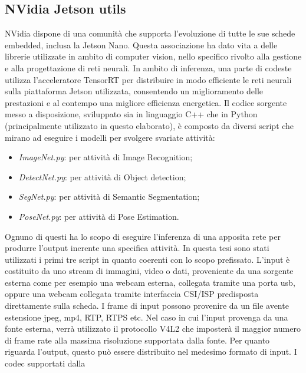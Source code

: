 \subsection{NVidia Jetson utils}\label{utils}
NVidia dispone di una comunità che supporta l'evoluzione di tutte le sue schede 
embedded, inclusa la Jetson Nano. Questa associazione ha dato vita 
a delle librerie utilizzate in ambito di computer vision, nello specifico rivolto 
alla gestione e alla  progettazione di reti neurali. In ambito di inferenza, una 
parte di codeste utilizza l'acceleratore TensorRT per distribuire in modo 
efficiente le reti neurali sulla piattaforma Jetson utilizzata, consentendo 
un miglioramento delle prestazioni e al contempo una migliore efficienza 
energetica. Il codice sorgente messo a disposizione, sviluppato sia in linguaggio 
C++ che in Python (principalmente utilizzato in questo elaborato), 
è composto da diversi script che mirano ad eseguire i modelli per svolgere 
svariate attività:
\begin{itemize}
    \item \emph{ImageNet.py}: per attività di Image Recognition;
    \item \emph{DetectNet.py}: per attività di Object detection;
    \item \emph{SegNet.py}: per attività di Semantic Segmentation;
    \item \emph{PoseNet.py}: per attività di Pose Estimation.
\end{itemize}
Ognuno di questi ha lo scopo di eseguire l'inferenza di una apposita rete 
per produrre l'output inerente una specifica attività. In questa tesi sono 
stati utilizzati i primi tre script in quanto coerenti con lo scopo prefissato. 
L'input è costituito da uno stream di immagini, video o dati, proveniente 
da una sorgente esterna come per esempio una webcam esterna, collegata 
tramite una porta usb, oppure una webcam collegata tramite interfaccia 
CSI/ISP predisposta direttamente sulla scheda. I frame di input possono 
provenire da un file avente estensione jpeg, mp4, RTP, RTPS etc. Nel caso 
in cui l'input provenga da una fonte esterna, verrà utilizzato il protocollo 
V4L2 che imposterà il maggior numero di frame rate alla massima risoluzione 
supportata dalla fonte. Per quanto riguarda l'output, questo può 
essere distribuito nel medesimo formato di input. I codec supportati dalla 
